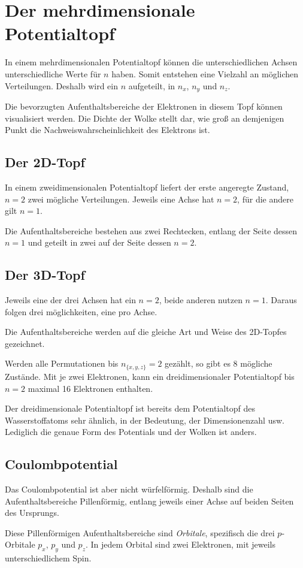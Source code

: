 \documentclass{article}
\begin{document}
\section{Der mehrdimensionale Potentialtopf}
In einem mehrdimensionalen Potentialtopf können die unterschiedlichen Achsen unterschiedliche Werte für $n$ haben. Somit entstehen eine Vielzahl an möglichen Verteilungen. Deshalb wird ein $n$ aufgeteilt, in $n_x$, $n_y$ und $n_z$.
 
Die bevorzugten Aufenthaltsbereiche der Elektronen in diesem Topf können visualisiert werden. Die Dichte der Wolke stellt dar, wie groß an demjenigen Punkt die Nachweiswahrscheinlichkeit des Elektrons ist.
 
\subsection{Der 2D-Topf}
In einem zweidimensionalen Potentialtopf liefert der erste angeregte Zustand, $n=2$ zwei mögliche Verteilungen. Jeweils eine Achse hat $n=2$, für die andere gilt $n=1$.
 
Die Aufenthaltsbereiche bestehen aus zwei Rechtecken, entlang der Seite dessen $n=1$ und geteilt in zwei auf der Seite dessen $n=2$.
 
\subsection{Der 3D-Topf}
Jeweils eine der drei Achsen hat ein $n=2$, beide anderen nutzen $n=1$. Daraus folgen drei möglichkeiten, eine pro Achse.
 
Die Aufenthaltsbereiche werden auf die gleiche Art und Weise des 2D-Topfes gezeichnet. 
 
Werden alle Permutationen bis $n_{\{x,y,z\}}=2$ gezählt, so gibt es 8 mögliche Zustände. Mit je zwei Elektronen, kann ein dreidimensionaler Potentialtopf bis $n=2$ maximal 16 Elektronen enthalten. 
 
Der dreidimensionale Potentialtopf ist bereits dem Potentialtopf des Wasserstoffatoms sehr ähnlich, in der Bedeutung, der Dimensionenzahl usw. Lediglich die genaue Form des Potentials und der Wolken ist anders.
 
\subsection{Coulombpotential}
Das Coulombpotential ist aber nicht würfelförmig. Deshalb sind die Aufenthaltsbereiche Pillenförmig, entlang jeweils einer Achse auf beiden Seiten des Ursprungs.
 
Diese Pillenförmigen Aufenthaltsbereiche sind \emph{Orbitale}, spezifisch die drei $p$-Orbitale $p_x$, $p_y$ und $p_z$. In jedem Orbital sind zwei Elektronen, mit jeweils unterschiedlichem Spin.
 
\end{document}
